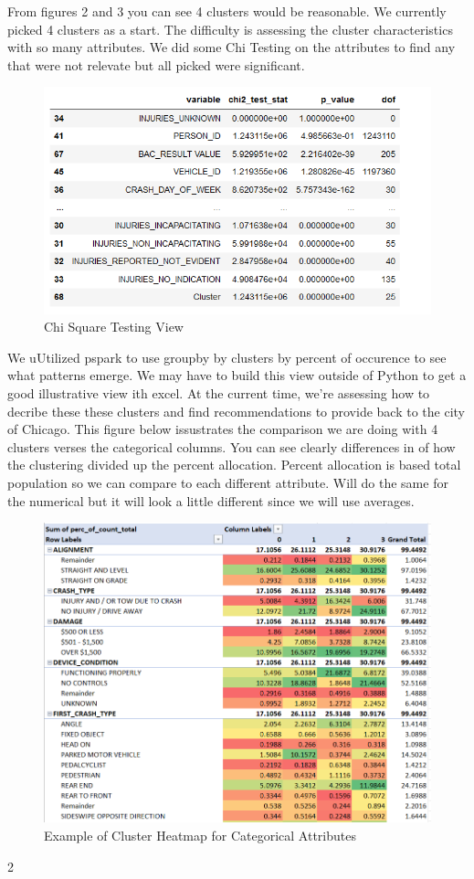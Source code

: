 \documentclass[conference]{IEEEtran}
\begin{document}
From figures 2 and 3 you can see 4 clusters would be reasonable.  We currently picked 4 clusters as a start. The difficulty is assessing the 
cluster characteristics with so many attributes.  We did some Chi Testing on the attributes to find any that were not relevate but all picked were significant.
\begin{figure}[!h]
	\includegraphics[width=\linewidth]{Chi Square.png}
	\caption{Chi Square Testing View}
	\label{table: Chi Square Testing View}
\end{figure}
We uUtilized pspark to use groupby by clusters by percent of occurence to see what patterns emerge.  We may have to build this view outside of Python to get a good illustrative view ith excel.  At the current time, we're assessing how to decribe these these clusters and find recommendations to provide back to the city of Chicago. This figure below issustrates the comparison we are doing with 4 clusters verses the categorical columns.  You can see clearly differences in of how the clustering divided up the percent allocation. Percent allocation is based total population so we can compare to each different attribute.  Will do the same for the numerical but it will look a little different since we will use averages.
\begin{figure}[!h]
	\includegraphics[width=\linewidth]{KP_Percent_ALL.png}
	\caption{Example of Cluster Heatmap for Categorical Attributes }
	\label{fig: Example of Cluster Heatmap for Categorical Attributes (4 Clusters)}
\end{figure}
2
\end{document}
